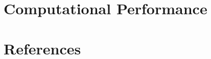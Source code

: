 \documentclass[11pt, letterpaper]{article}
\numberwithin{equation}{section}
\begin{document}
\section{Computational Performance}
\label{app:runtime}
\begin{table}[ht]\centering
\caption{Runtime by number of nodes and layers for each approach,
including the DynSBM scaling limit referenced in the main text.}
\label{tab:app_runtime}
\end{table}
\section*{References}


\end{document}
